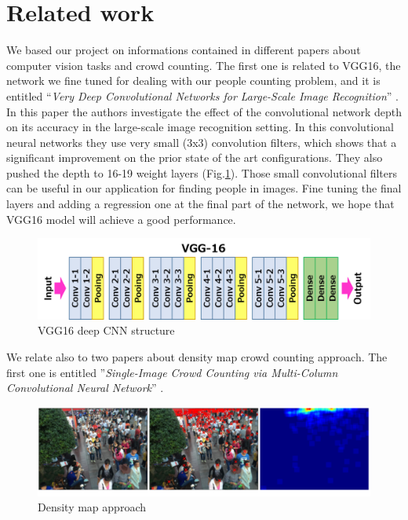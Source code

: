 \documentclass[10pt,twocolumn,letterpaper]{article}
\begin{document}
\section{Related work}

We based our project on informations contained in different papers about computer vision tasks and crowd counting. The first one is related to VGG16, the network we fine tuned for dealing with our people counting problem, and it is entitled “\textit{Very Deep Convolutional Networks for Large-Scale Image Recognition}” \cite{simonyan2014very}. In this paper the authors investigate the effect of the convolutional network depth on its accuracy in the
large-scale image recognition setting. In this convolutional neural networks they use very small (3x3) convolution filters, which shows that a significant improvement on the prior state of the art configurations. They also pushed the depth to 16-19 weight layers (Fig.\ref{fig:vgg16}). Those small convolutional filters can be useful in our application for finding people in images. Fine tuning the final layers and adding a regression one at the final part of the network, we hope that VGG16 model will achieve a good performance. 

\begin{figure}[h!]
  \includegraphics[width=\linewidth]{pics/vgg16.png}
  \caption{VGG16 deep CNN structure}
  \label{fig:vgg16}
\end{figure}

We relate also to two papers about density map crowd counting approach. The first one is entitled ”\textit{Single-Image Crowd Counting via Multi-Column Convolutional Neural Network}” \cite{zhang2016single}.

\begin{figure}[h!]
  \includegraphics[width=\linewidth]{pics/densitymapapproach.png}
  \caption{Density map approach}
  \label{fig:densitymap}
\end{figure}
\end{document}

